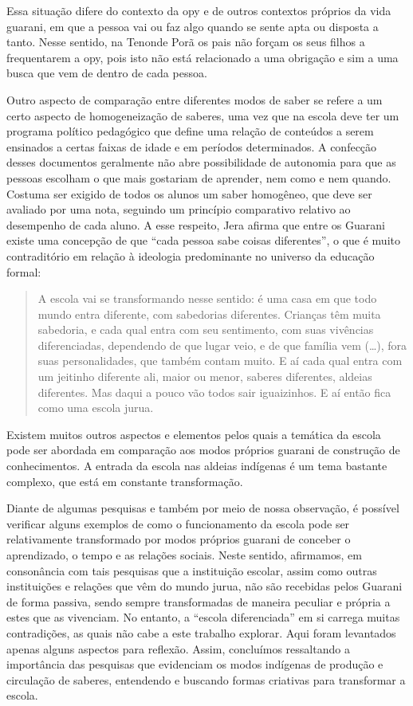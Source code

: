Essa situação difere do contexto da opy e de outros contextos próprios
da vida guarani, em que a pessoa vai ou faz algo quando se sente apta
ou disposta a tanto. Nesse sentido, na Tenonde Porã os pais não forçam
os seus filhos a frequentarem a opy, pois isto não está relacionado a
uma obrigação e sim a uma busca que vem de dentro de cada pessoa.

Outro aspecto de comparação entre diferentes modos de saber se refere a
um certo aspecto de homogeneização de saberes, uma vez que na escola
deve ter um programa político pedagógico que define uma relação de
conteúdos a serem ensinados a certas faixas de idade e em períodos
determinados. A confecção desses documentos geralmente não abre
possibilidade de autonomia para que as pessoas escolham o que mais
gostariam de aprender, nem como e nem quando. Costuma ser exigido de
todos os alunos um saber homogêneo, que deve ser avaliado por uma nota,
seguindo um princípio comparativo relativo ao desempenho de cada aluno.
A esse respeito, Jera afirma que entre os Guarani existe uma concepção
de que ``cada pessoa sabe coisas diferentes'', o que é muito
contraditório em relação à ideologia predominante no universo da
educação formal: 

\begin{quotation}
A escola vai se transformando nesse sentido: é uma casa em que todo
mundo entra diferente, com sabedorias diferentes. Crianças têm muita
sabedoria, e cada qual entra com seu sentimento, com suas vivências
diferenciadas, dependendo de que lugar veio, e de que família vem
(\ldots{}), fora suas personalidades, que também contam muito. E aí cada
qual entra com um jeitinho diferente ali, maior ou menor, saberes
diferentes, aldeias diferentes. Mas daqui a pouco vão todos sair
iguaizinhos. E aí então fica como uma escola jurua.
\end{quotation}

Existem muitos outros aspectos e elementos pelos quais a temática da
escola pode ser abordada em comparação aos modos próprios guarani de
construção de conhecimentos. A entrada da escola nas aldeias indígenas
é um tema bastante complexo, que está em constante transformação.

Diante de algumas pesquisas e também por meio de nossa observação, é
possível verificar alguns exemplos de como o funcionamento da escola
pode ser relativamente transformado por modos próprios guarani de
conceber o aprendizado, o tempo e as relações sociais. Neste sentido,
afirmamos, em consonância com tais pesquisas que a instituição escolar,
assim como outras instituições e relações que vêm do mundo jurua, não
são recebidas pelos Guarani de forma passiva, sendo sempre
transformadas de maneira peculiar e própria a estes que as vivenciam.
No entanto, a ``escola diferenciada'' em si carrega muitas contradições,
as quais não cabe a este trabalho explorar. Aqui foram levantados
apenas alguns aspectos para reflexão. Assim, concluímos ressaltando a
importância das pesquisas que evidenciam os modos indígenas de produção
e circulação de saberes, entendendo e buscando formas criativas para
transformar a escola.

